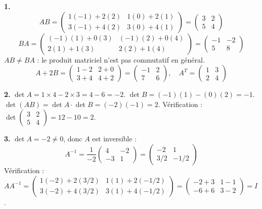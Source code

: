 \documentclass[12pt,a4paper]{article}
\begin{document}
\begin{boitecorrige}
\textbf{1.}
\[
AB = \begin{pmatrix}1(-1)+2(2) & 1(0)+2(1)\\ 3(-1)+4(2) & 3(0)+4(1)\end{pmatrix}
= \begin{pmatrix}3&2\\5&4\end{pmatrix}
\]
\[
BA = \begin{pmatrix}(-1)(1)+0(3) & (-1)(2)+0(4)\\ 2(1)+1(3) & 2(2)+1(4)\end{pmatrix}
= \begin{pmatrix}-1&-2\\5&8\end{pmatrix}
\]
$AB \neq BA$ : le produit matriciel n'est pas commutatif en général.
\[
A+2B = \begin{pmatrix}1-2&2+0\\3+4&4+2\end{pmatrix} = \begin{pmatrix}-1&2\\7&6\end{pmatrix}, \quad A^T = \begin{pmatrix}1&3\\2&4\end{pmatrix}
\]

\textbf{2.} $\det A = 1\times4 - 2\times3 = 4-6 = -2$. $\det B = (-1)(1)-(0)(2) = -1$. $\det(AB) = \det A\cdot\det B = (-2)(-1) = 2$. Vérification : $\det\begin{pmatrix}3&2\\5&4\end{pmatrix}=12-10=2$.

\textbf{3.} $\det A = -2 \neq 0$, donc $A$ est inversible :
\[
A^{-1} = \frac{1}{-2}\begin{pmatrix}4&-2\\-3&1\end{pmatrix} = \begin{pmatrix}-2&1\\3/2&-1/2\end{pmatrix}
\]
Vérification : $AA^{-1} = \begin{pmatrix}1(- 2)+2(3/2) & 1(1)+2(-1/2)\\ 3(-2)+4(3/2) & 3(1)+4(-1/2)\end{pmatrix} = \begin{pmatrix}-2+3 & 1-1\\ -6+6 & 3-2\end{pmatrix} = I$.
\end{boitecorrige}
\end{document}
